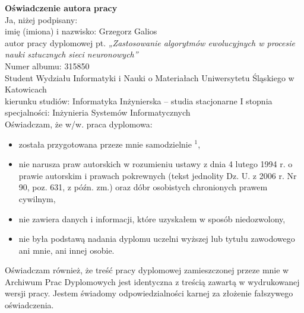 \documentclass[twoside,a4paper,12pt]{extreport} %
\begin{document}
\newpage

\setcounter{page}{1} \pagestyle{fancy}
\renewcommand{\chaptermark}[1]{\markboth{\chaptername%
\ \thechapter:\,\ #1}{}}
\renewcommand{\sectionmark}[1]{\markright{\thesection\,\ #1}}




\newpage
\textbf{Oświadczenie autora pracy}\\

Ja, niżej podpisany: \\

\hspace{1.5cm} imię (imiona) i nazwisko: Grzegorz Galios \\

\hspace{1.5cm} autor pracy dyplomowej pt. 
\textit{„Zastosowanie algorytmów ewolucyjnych w procesie nauki sztucznych sieci
neuronowych”}\\

Numer albumu: 315850 \\

Student Wydziału Informatyki i Nauki o Materiałach Uniwersytetu Śląskiego w Katowicach \\ 

kierunku studiów: Informatyka Inżynierska – studia stacjonarne I stopnia \\

specjalności: Inżynieria Systemów Informatycznych \\

Oświadczam, że w/w. praca dyplomowa:   
\begin{itemize}
\item została przygotowana przeze mnie samodzielnie $^1$,  
\item nie narusza praw autorskich w rozumieniu ustawy z dnia 4 lutego 1994 r. o prawie autorskim i prawach pokrewnych (tekst jednolity Dz. U. z 2006 r. Nr 90, poz. 631, z późn. zm.) oraz dóbr osobistych chronionych prawem cywilnym,  
\item nie zawiera danych i informacji, które uzyskałem w sposób niedozwolony,  
\item nie była podstawą nadania dyplomu uczelni wyższej lub tytułu zawodowego ani mnie, ani innej osobie.  
\end{itemize}
Oświadczam również, że treść pracy dyplomowej zamieszczonej przeze mnie w Archiwum Prac Dyplomowych jest identyczna z treścią zawartą w wydrukowanej wersji pracy.  Jestem świadomy odpowiedzialności karnej za złożenie fałszywego oświadczenia.\\\\\\
\end{document}
